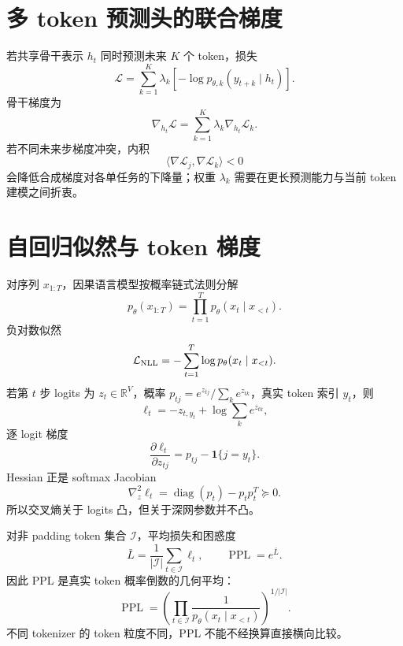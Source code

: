 \documentclass[11pt]{article}
\numberwithin{equation}{section}
\newcommand{\R}{\mathbb{R}}
\newcommand{\1}{\mathbf{1}}
\newcommand{\cL}{\mathcal{L}}
\newcommand{\diag}{\operatorname{diag}}
\begin{document}
\section{多 token 预测头的联合梯度}

若共享骨干表示 $h_t$ 同时预测未来 $K$ 个 token，损失
\begin{equation}
 \cL=\sum_{k=1}^{K}\lambda_k
 [-\log p_{\theta,k}(y_{t+k}\mid h_t)].
\end{equation}
骨干梯度为
\begin{equation}
 \nabla_{h_t}\cL=
 \sum_{k=1}^{K}\lambda_k\nabla_{h_t}\cL_k.
\end{equation}
若不同未来步梯度冲突，内积
\begin{equation}
 \langle\nabla\cL_j,\nabla\cL_k\rangle<0
\end{equation}
会降低合成梯度对各单任务的下降量；权重 $\lambda_k$ 需要在更长预测能力与当前 token 建模之间折衷。

\section{自回归似然与 token 梯度}

对序列 $x_{1:T}$，因果语言模型按概率链式法则分解
\begin{equation}
 p_\theta(x_{1:T})=\prod_{t=1}^{T}p_\theta(x_t\mid x_{<t}).
\end{equation}
负对数似然
\begin{equation}
 \cL_{\rm NLL}=-\sum_{t=1}^{T}\log p_\theta(x_t\mid x_{<t}).
\end{equation}
若第 $t$ 步 logits 为 $z_t\in\R^{V}$，概率
$p_{tj}=e^{z_{tj}}/\sum_ke^{z_{tk}}$，真实 token 索引 $y_t$，则
\begin{equation}
 \ell_t=-z_{t,y_t}+\log\sum_ke^{z_{tk}},
\end{equation}
逐 logit 梯度
\begin{equation}
 \frac{\partial\ell_t}{\partial z_{tj}}
 =p_{tj}-\1\{j=y_t\}.
\end{equation}
Hessian 正是 softmax Jacobian
\begin{equation}
 \nabla_z^2\ell_t=\diag(p_t)-p_tp_t^T\succeq0.
\end{equation}
所以交叉熵关于 logits 凸，但关于深网参数并不凸。

对非 padding token 集合 $\mathcal I$，平均损失和困惑度
\begin{equation}
 \bar L=\frac1{|\mathcal I|}\sum_{t\in\mathcal I}\ell_t,
 \qquad \operatorname{PPL}=e^{\bar L}.
\end{equation}
因此 PPL 是真实 token 概率倒数的几何平均：
\begin{equation}
 \operatorname{PPL}=\left(
 \prod_{t\in\mathcal I}\frac1{p_\theta(x_t\mid x_{<t})}
 \right)^{1/|\mathcal I|}.
\end{equation}
不同 tokenizer 的 token 粒度不同，PPL 不能不经换算直接横向比较。
\end{document}
